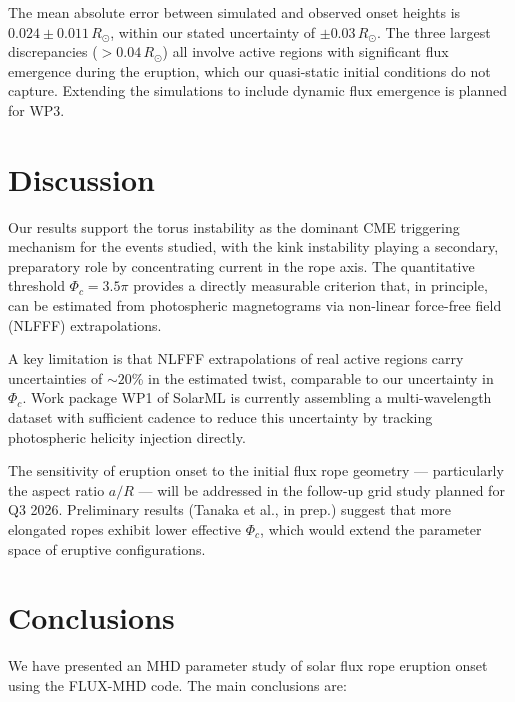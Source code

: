 \documentclass[twocolumn]{aastex631}
\begin{document}
The mean absolute error between simulated and observed onset heights is
$0.024 \pm 0.011\,R_\odot$, within our stated uncertainty of $\pm 0.03\,R_\odot$.
The three largest discrepancies ($> 0.04\,R_\odot$) all involve active regions
with significant flux emergence during the eruption, which our quasi-static
initial conditions do not capture. Extending the simulations to include dynamic
flux emergence is planned for WP3.

\section{Discussion}
\label{sec:discussion}

Our results support the torus instability as the dominant CME triggering mechanism
for the events studied, with the kink instability playing a secondary, preparatory
role by concentrating current in the rope axis. The quantitative threshold
$\Phi_c = 3.5\pi$ provides a directly measurable criterion that, in principle,
can be estimated from photospheric magnetograms via non-linear force-free field
(NLFFF) extrapolations.

A key limitation is that NLFFF extrapolations of real active regions carry
uncertainties of $\sim 20$\% in the estimated twist, comparable to our uncertainty
in $\Phi_c$. Work package WP1 of SolarML is currently assembling a multi-wavelength
dataset with sufficient cadence to reduce this uncertainty by tracking
photospheric helicity injection directly.

The sensitivity of eruption onset to the initial flux rope geometry — particularly
the aspect ratio $a/R$ — will be addressed in the follow-up grid study planned
for Q3 2026. Preliminary results (Tanaka et al., in prep.) suggest that more
elongated ropes exhibit lower effective $\Phi_c$, which would extend the
parameter space of eruptive configurations.

\section{Conclusions}
\label{sec:conclusions}

We have presented an MHD parameter study of solar flux rope eruption onset using
the \textsc{FLUX-MHD} code. The main conclusions are:
\end{document}
